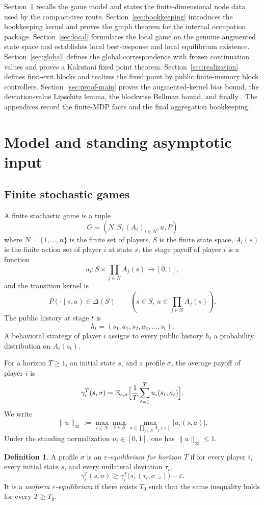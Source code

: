 \documentclass[12pt]{article}
\theoremstyle{definition}
\newtheorem{definition}[theorem]{Definition}
\newcommand{\eps}{\varepsilon}
\newcommand{\E}{\mathbb{E}}
\newcommand{\1}{\mathbf{1}}
\begin{document}
Section~\ref{sec:model} recalls the game model and states the finite-dimensional
node data used by the compact-tree route. Section~\ref{sec:bookkeeping}
introduces the bookkeeping kernel and proves the graph theorem for the internal
occupation package. Section~\ref{sec:local} formulates the local game on the
genuine augmented state space and establishes local best-response and local
equilibrium existence. Section~\ref{sec:global} defines the global correspondence
with frozen continuation values and proves a Kakutani fixed point theorem.
Section~\ref{sec:realization} defines first-exit blocks and realizes the fixed
point by public finite-memory block controllers. Section~\ref{sec:proof-main}
proves the augmented-kernel bias bound, the deviation-value Lipschitz lemma, the
blockwise Bellman bound, and finally . The appendices record the
finite-MDP facts and the final aggregation bookkeeping.

\section{Model and standing asymptotic input}
\label{sec:model}

\subsection{Finite stochastic games}

A finite stochastic game is a tuple
\[
G=(N,S,(A_i)_{i\in N},u,P)
\]
where $N=\{1,\dots,n\}$ is the finite set of players, $S$ is the finite state
space, $A_i(s)$ is the finite action set of player $i$ at state $s$, the stage
payoff of player $i$ is a function
\[
u_i:S\times \prod_{j\in N}A_j(s)\to [0,1],
\]
and the transition kernel is
\[
P(\cdot\mid s,a)\in \Delta(S)
\qquad (s\in S,\ a\in \prod_{j\in N}A_j(s)).
\]
The public history at stage $t$ is
\[
h_t=(s_1,a_1,s_2,a_2,\dots,s_t).
\]
A behavioral strategy of player $i$ assigns to every public history $h_t$ a
probability distribution on $A_i(s_t)$.

For a horizon $T\ge 1$, an initial state $s$, and a profile $\sigma$, the average
payoff of player $i$ is
\[
\gamma_i^T(s,\sigma)
=
\E_{s,\sigma}\Bigl[\frac1T\sum_{t=1}^T u_i(s_t,a_t)\Bigr].
\]
We write
\[
\|u\|_\infty
:=
\max_{i\in N}\max_{s\in S}\max_{a\in\prod_{j\in N}A_j(s)} |u_i(s,a)|.
\]
Under the standing normalization $u_i\in[0,1]$, one has $\|u\|_\infty\le 1$.

\begin{definition}
A profile $\sigma$ is an \emph{$\eps$-equilibrium for horizon $T$} if for every
player $i$, every initial state $s$, and every unilateral deviation $\tau_i$,
\[
\gamma_i^T(s,\sigma)
\ge
\gamma_i^T\bigl(s,(\tau_i,\sigma_{-i})\bigr)-\eps.
\]
It is a \emph{uniform $\eps$-equilibrium} if there exists $T_0$ such that the same
inequality holds for every $T\ge T_0$.
\end{definition}
\end{document}
